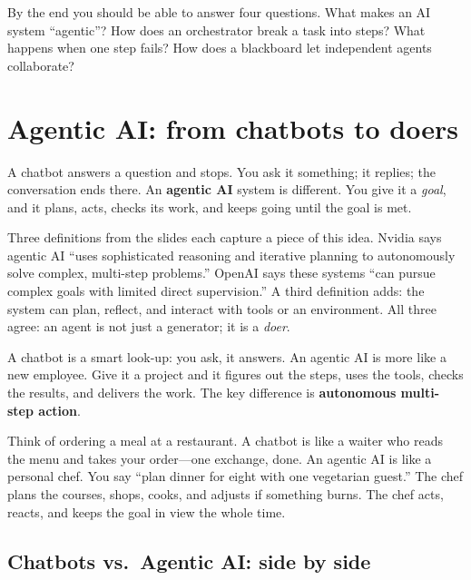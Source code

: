 \documentclass[a4paper,11pt]{article}
\newcommand{\vocab}[1]{\textbf{\color{navy}#1}}
\begin{document}
By the end you should be able to answer four questions.
What makes an AI system ``agentic''?
How does an orchestrator break a task into steps?
What happens when one step fails?
How does a blackboard let independent agents collaborate?

\section{Agentic AI: from chatbots to doers}

A chatbot answers a question and stops.
You ask it something; it replies; the conversation ends there.
An \vocab{agentic AI} system is different.
You give it a \emph{goal}, and it plans, acts, checks its work, and keeps going until the goal is met.

Three definitions from the slides each capture a piece of this idea.
Nvidia says agentic AI ``uses sophisticated reasoning and iterative planning to autonomously solve complex, multi-step problems.''
OpenAI says these systems ``can pursue complex goals with limited direct supervision.''
A third definition adds: the system can plan, reflect, and interact with tools or an environment.
All three agree: an agent is not just a generator; it is a \emph{doer}.

\begin{intuition}
A chatbot is a smart look-up: you ask, it answers.
An agentic AI is more like a new employee.
Give it a project and it figures out the steps, uses the tools, checks the results, and delivers the work.
The key difference is \textbf{autonomous multi-step action}.
\end{intuition}

\begin{everyday}
Think of ordering a meal at a restaurant.
A chatbot is like a waiter who reads the menu and takes your order---one exchange, done.
An agentic AI is like a personal chef.
You say ``plan dinner for eight with one vegetarian guest.''
The chef plans the courses, shops, cooks, and adjusts if something burns.
The chef acts, reacts, and keeps the goal in view the whole time.
\end{everyday}

\subsection{Chatbots vs.\ Agentic AI: side by side}
\end{document}

